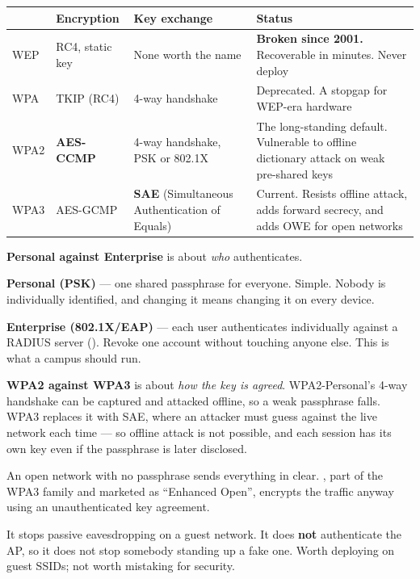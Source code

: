 \begin{longtable}{@{}L{1.9cm}L{2.9cm}L{3.6cm}L{6.1cm}@{}}
\toprule
{}
\textbf{} & \textbf{Encryption} & \textbf{Key exchange} & \textbf{Status} \\
\midrule
\endhead
WEP & RC4, static key & None worth the name &
\textbf{Broken since 2001.} Recoverable in minutes. Never deploy \\
WPA & TKIP (RC4) & 4-way handshake &
Deprecated. A stopgap for WEP-era hardware \\
WPA2 & \textbf{AES-CCMP} & 4-way handshake, PSK or 802.1X &
The long-standing default. Vulnerable to offline dictionary attack on weak
pre-shared keys \\
WPA3 & AES-GCMP &
\textbf{SAE} (Simultaneous Authentication of Equals) &
Current. Resists offline attack, adds forward secrecy, and adds OWE for open
networks \\
\bottomrule
\end{longtable}

\begin{examnote}
\textbf{Personal against Enterprise} is about \emph{who} authenticates.

\begin{tight}
  \item \textbf{Personal (PSK)} --- one shared passphrase for everyone. Simple.
        Nobody is individually identified, and changing it means changing it on
        every device.
  \item \textbf{Enterprise (802.1X/EAP)} --- each user authenticates
        individually against a RADIUS server (). Revoke one account
        without touching anyone else. This is what a campus should run.
\end{tight}

\textbf{WPA2 against WPA3} is about \emph{how the key is agreed}. WPA2-Personal's
4-way handshake can be captured and attacked offline, so a weak passphrase falls.
WPA3 replaces it with SAE, where an attacker must guess against the live network
each time --- so offline attack is not possible, and each session has its own key
even if the passphrase is later disclosed.
\end{examnote}

\begin{conceptbox}
An open network with no passphrase sends everything in clear. , part of the WPA3 family and marketed as ``Enhanced Open'',
encrypts the traffic anyway using an unauthenticated key agreement.

It stops passive eavesdropping on a guest network. It does \textbf{not}
authenticate the AP, so it does not stop somebody standing up a fake one. Worth
deploying on guest SSIDs; not worth mistaking for security.
\end{conceptbox}

